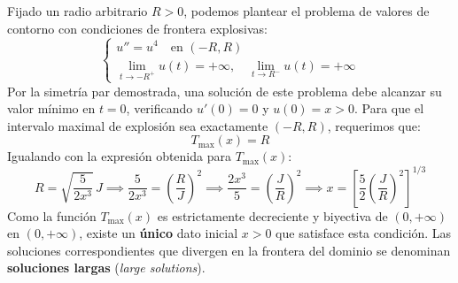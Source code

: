 {    Fijado un radio arbitrario $R > 0$, podemos plantear el problema de valores de contorno con condiciones de frontera explosivas:
    \[
        \begin{cases}
            u'' = u^4 \quad \text{en } (-R, R) \\
            \displaystyle\lim_{t \to -R^+} u(t) = +\infty, \quad \lim_{t \to R^-} u(t) = +\infty
        \end{cases}
    \]
    Por la simetría par demostrada, una solución de este problema debe alcanzar su valor mínimo en $t = 0$, verificando $u'(0) = 0$ y $u(0) = x > 0$. Para que el intervalo maximal de explosión sea exactamente $(-R, R)$, requerimos que:
    \[
        T_{\max}(x) = R
    \]
    Igualando con la expresión obtenida para $T_{\max}(x)$:
    \[
        R = \sqrt{\frac{5}{2x^3}} \, J \implies \frac{5}{2x^3} = \left(\frac{R}{J}\right)^2 \implies \frac{2x^3}{5} = \left(\frac{J}{R}\right)^2 \implies x = \left[ \frac{5}{2} \left( \frac{J}{R} \right)^2 \right]^{1/3}
    \]
    Como la función $T_{\max}(x)$ es estrictamente decreciente y biyectiva de $(0, +\infty)$ en $(0, +\infty)$, existe un \textbf{único} dato inicial $x > 0$ que satisface esta condición. Las soluciones correspondientes que divergen en la frontera del dominio se denominan \textbf{soluciones largas} (\textit{large solutions}).

    \begin{center}
    \end{center}
}

